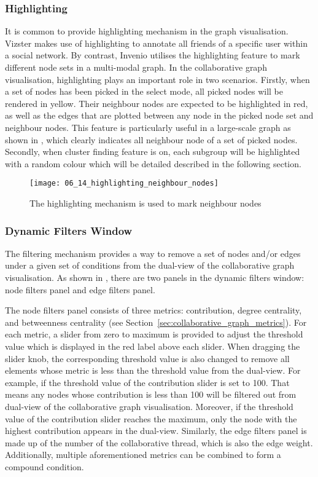 \subsubsection{Highlighting} \label{sec:collaborative_graph_highlighting}

It is common to provide highlighting mechanism in the graph visualisation. Vizster \citep{Heer2005a} makes use of highlighting to annotate all friends of a specific user within a social network. By contrast, Invenio \citep{Singh2007} utilises the highlighting feature to mark different node sets in a multi-modal graph. In the collaborative graph visualisation, highlighting plays an important role in two scenarios. Firstly, when a set of nodes has been picked in the select mode, all picked nodes will be rendered in yellow. Their neighbour nodes are expected to be highlighted in red, as well as the edges that are plotted between any node in the picked node set and neighbour nodes. This feature is particularly useful in a large-scale graph as shown in , which clearly indicates all neighbour node of a set of picked nodes. Secondly, when cluster finding feature is on, each subgroup will be highlighted with a random colour which will be detailed described in the following section.

\begin{figure}[!htb]
  \centering
  \texttt{[image: 06\_14\_highlighting\_neighbour\_nodes]}
  \caption{The highlighting mechanism is used to mark neighbour nodes}
  \label{Figure:06_14}
\end{figure}

\subsubsection{Dynamic Filters Window} \label{sec:collaborative_graph_filters_window}

The filtering mechanism provides a way to remove a set of nodes and/or edges under a given set of conditions from the dual-view of the collaborative graph visualisation. As shown in , there are two panels in the dynamic filters window: node filters panel and edge filters panel.

The node filters panel consists of three metrics: contribution, degree centrality, and betweenness centrality (see Section~\ref{sec:collaborative_graph_metrics}). For each metric, a slider from zero to maximum is provided to adjust the threshold value which is displayed in the red label above each slider. When dragging the slider knob, the corresponding threshold value is also changed to remove all elements whose metric is less than the threshold value from the dual-view. For example, if the threshold value of the contribution slider is set to 100. That means any nodes whose contribution is less than 100 will be filtered out from dual-view of the collaborative graph visualisation. Moreover, if the threshold value of the contribution slider reaches the maximum, only the node with the highest contribution appears in the dual-view. Similarly, the edge filters panel is made up of the number of the collaborative thread, which is also the edge weight. Additionally, multiple aforementioned metrics can be combined to form a compound condition.

